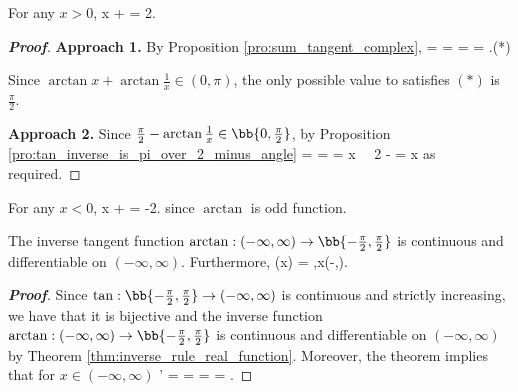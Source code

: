 \begin{proposition}
For any $x>0$, %
\be
\arctan x + \arctan {} = \frac{\pi}2.
\ee
\end{proposition}



\begin{proof}[\bf Proof]
{\bf Approach 1.} By Proposition \ref{pro:sum_tangent_complex},
\be
\tan{} =  =  =  = \infty.\qquad (*)
\ee

Since $\arctan x + \arctan \frac 1{x} \in (0,\pi)$, the only possible value to satisfies $(*)$ is $\frac{\pi}2$.

{\bf Approach 2.} Since $\frac{\pi}2 - \arctan \frac 1{x}\in \bb{0,\frac{\pi}2}$, by Proposition \ref{pro:tan_inverse_is_pi_over_2_minus_angle}
\be
\tan{} =  =  = x \ \ra\ \frac{\pi}2 - \arctan {} = \arctan x
\ee
as required.
\end{proof}

\begin{remark}
For any $x<0$,
\be
\arctan x + \arctan {} = -\frac{\pi}2.
\ee
since $\arctan$ is odd function.
\end{remark}



\begin{theorem}
The inverse tangent function $\arctan:(-\infty,\infty)\to \bb{-\frac{\pi}2,\frac{\pi}2}$ is continuous and differentiable on $(-\infty,\infty)$. Furthermore,
\be
{} \arctan(x) = ,\qquad x\in (-\infty,\infty).
\ee
\end{theorem}

\begin{proof}[\bf Proof]
Since $\tan:\bb{-\frac{\pi}2,\frac{\pi}2}\to (-\infty,\infty)$ is continuous and strictly increasing, we have that it is bijective and the inverse function $\arctan:(-\infty,\infty)\to \bb{-\frac{\pi}2,\frac{\pi}2}$ is continuous and differentiable on $(-\infty,\infty)$ by Theorem \ref{thm:inverse_rule_real_function}. Moreover, the theorem implies that for $x\in (-\infty,\infty)$
\be
{}' =  =  =  = .
\ee
\end{proof}


